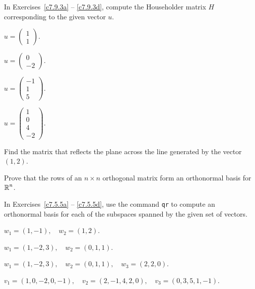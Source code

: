 \documentclass{ximera}
\begin{document}
\noindent In Exercises~\ref{c7.9.3a} -- \ref{c7.9.3d}, compute the
Householder matrix $H$ corresponding to the given vector $u$.
\begin{exercise} \label{c7.9.3a}
$u = \left(\begin{array}{r} 1\\ 1 \end{array}\right)$.
\end{exercise}
\begin{exercise} \label{c7.9.3b}
$u = \left(\begin{array}{r} 0\\ -2 \end{array}\right)$.
\end{exercise}
\begin{exercise} \label{c7.9.3c}
$u = \left(\begin{array}{r} -1\\ 1 \\5\end{array}\right)$.
\end{exercise}
\begin{exercise} \label{c7.9.3d}
$u = \left(\begin{array}{r} 1\\ 0 \\ 4\\ -2\end{array}\right)$.
\end{exercise}

\begin{exercise} \label{c7.9.4}
Find the matrix that reflects the plane across the line generated by the
vector $(1,2)$.
\end{exercise}

\begin{exercise}  \label{c7.9.45}
Prove that the rows of an $n\times n$ orthogonal matrix form an orthonormal
basis for $\mbox{$\Bbb{R}$}^n$.
\end{exercise}

\CEXER

In Exercises~\ref{c7.5.5a} -- \ref{c7.5.5d}, use the \Matlab command
{\tt qr} to compute an orthonormal basis for each of the subspaces spanned
by the given set of vectors.
\begin{exercise} \label{c7.5.5a}
$w_1=(1,-1),\quad w_2=(1,2)$.
\end{exercise}
\begin{exercise} \label{c7.5.5b}
$w_1=(1,-2,3),\quad w_2=(0,1,1)$.
\end{exercise}
\begin{exercise} \label{c7.5.5c}
$w_1=(1,-2,3),\quad w_2=(0,1,1),\quad w_3=(2,2,0)$.
\end{exercise}
\begin{exercise} \label{c7.5.5d}
$v_1=(1,0,-2,0,-1),\quad v_2=(2,-1,4,2,0),\quad v_3=(0,3,5,1,-1)$.
\end{exercise}
\end{document}
